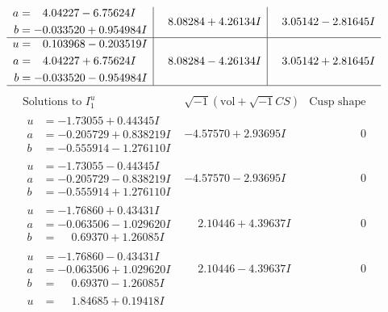 \documentclass[1p]{elsarticle_modified}
\theoremstyle{definition}
\newcommand{\I}{\sqrt{-1}}
\begin{document}
$$\begin{array}{c|c|c}
\begin{aligned}
a &= \phantom{-}4.04227 - 6.75624 I \\
b &= -0.033520 + 0.954984 I\end{aligned}
 & \phantom{-}8.08284 + 4.26134 I & \phantom{-}3.05142 - 2.81645 I \\ \hline\begin{aligned}
u &= \phantom{-}0.103968 - 0.203519 I \\
a &= \phantom{-}4.04227 + 6.75624 I \\
b &= -0.033520 - 0.954984 I\end{aligned}
 & \phantom{-}8.08284 - 4.26134 I & \phantom{-}3.05142 + 2.81645 I\\
 \hline 
 \end{array}$$\newpage$$\begin{array}{c|c|c}  
\text{Solutions to }I^u_{1}& \I (\text{vol} + \sqrt{-1}CS) & \text{Cusp shape}\\
 \hline 
\begin{aligned}
u &= -1.73055 + 0.44345 I \\
a &= -0.205729 + 0.838219 I \\
b &= -0.555914 - 1.276110 I\end{aligned}
 & -4.57570 + 2.93695 I & \phantom{-0.000000 } 0 \\ \hline\begin{aligned}
u &= -1.73055 - 0.44345 I \\
a &= -0.205729 - 0.838219 I \\
b &= -0.555914 + 1.276110 I\end{aligned}
 & -4.57570 - 2.93695 I & \phantom{-0.000000 } 0 \\ \hline\begin{aligned}
u &= -1.76860 + 0.43431 I \\
a &= -0.063506 - 1.029620 I \\
b &= \phantom{-}0.69370 + 1.26085 I\end{aligned}
 & \phantom{-}2.10446 + 4.39637 I & \phantom{-0.000000 } 0 \\ \hline\begin{aligned}
u &= -1.76860 - 0.43431 I \\
a &= -0.063506 + 1.029620 I \\
b &= \phantom{-}0.69370 - 1.26085 I\end{aligned}
 & \phantom{-}2.10446 - 4.39637 I & \phantom{-0.000000 } 0 \\ \hline\begin{aligned}
u &= \phantom{-}1.84685 + 0.19418 I \\

\end{aligned}
\end{array}$$
\end{document}
